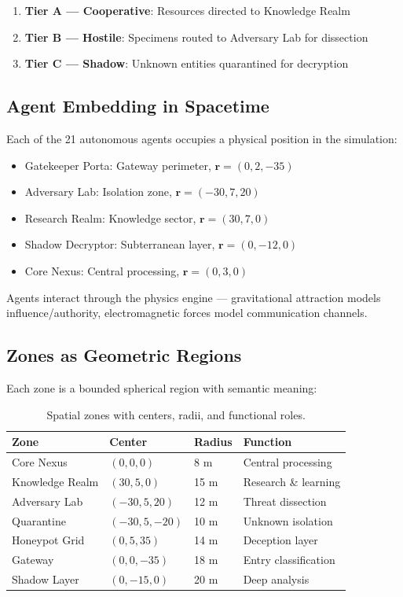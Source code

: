 \documentclass[12pt, a4paper]{article}
\begin{document}
\begin{enumerate}
    \item \textbf{Tier A — Cooperative}: Resources directed to Knowledge Realm
    \item \textbf{Tier B — Hostile}: Specimens routed to Adversary Lab for dissection
    \item \textbf{Tier C — Shadow}: Unknown entities quarantined for decryption
\end{enumerate}

\subsection{Agent Embedding in Spacetime}

Each of the 21 autonomous agents occupies a physical position in the simulation:
\begin{itemize}
    \item Gatekeeper Porta: Gateway perimeter, $\mathbf{r} = (0, 2, -35)$
    \item Adversary Lab: Isolation zone, $\mathbf{r} = (-30, 7, 20)$
    \item Research Realm: Knowledge sector, $\mathbf{r} = (30, 7, 0)$
    \item Shadow Decryptor: Subterranean layer, $\mathbf{r} = (0, -12, 0)$
    \item Core Nexus: Central processing, $\mathbf{r} = (0, 3, 0)$
\end{itemize}

Agents interact through the physics engine — gravitational attraction models
influence/authority, electromagnetic forces model communication channels.

\subsection{Zones as Geometric Regions}

Each zone is a bounded spherical region with semantic meaning:

\begin{table}[H]
\centering
\begin{tabular}{llll}
\toprule
\textbf{Zone} & \textbf{Center} & \textbf{Radius} & \textbf{Function} \\
\midrule
Core Nexus & $(0, 0, 0)$ & 8 m & Central processing \\
Knowledge Realm & $(30, 5, 0)$ & 15 m & Research \& learning \\
Adversary Lab & $(-30, 5, 20)$ & 12 m & Threat dissection \\
Quarantine & $(-30, 5, -20)$ & 10 m & Unknown isolation \\
Honeypot Grid & $(0, 5, 35)$ & 14 m & Deception layer \\
Gateway & $(0, 0, -35)$ & 18 m & Entry classification \\
Shadow Layer & $(0, -15, 0)$ & 20 m & Deep analysis \\
\bottomrule
\end{tabular}
\caption{Spatial zones with centers, radii, and functional roles.}
\end{table}
\end{document}
